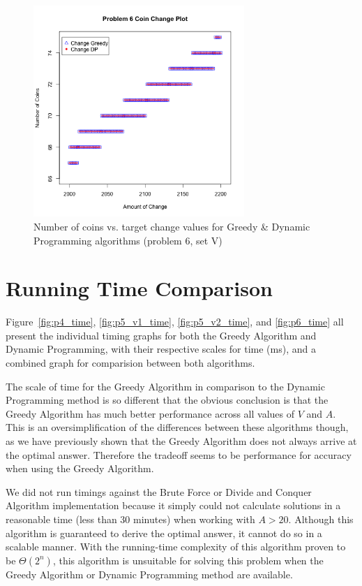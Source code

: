 \documentclass[11pt]{scrreprt}
\begin{document}
\begin{figure}[!h]
\centering
\includegraphics[width=8cm]{situation3.png}
\caption{Number of coins vs. target change values for Greedy \& Dynamic Programming algorithms (problem 6, set V)}
\label{fig:p6}
\end{figure}

\section{Running Time Comparison}
\label{sec:timings}

Figure~\ref{fig:p4_time}, \ref{fig:p5_v1_time}, \ref{fig:p5_v2_time}, and \ref{fig:p6_time} all present the individual timing graphs for both the Greedy Algorithm and Dynamic Programming, with their respective scales for time (ms), and a combined graph for comparision between both algorithms.

The scale of time for the Greedy Algorithm in comparison to the Dynamic Programming method is so different that the obvious conclusion is that the Greedy Algorithm has much better performance across all values of $V$ and $A$. This is an oversimplification of the differences between these algorithms though, as we have previously shown that the Greedy Algorithm does not always arrive at the optimal answer. Therefore the tradeoff seems to be performance for accuracy when using the Greedy Algorithm.

We did not run timings against the Brute Force or Divide and Conquer Algorithm implementation because it simply could not calculate solutions in a reasonable time (less than 30 minutes) when working with $A>20$. Although this algorithm is guaranteed to derive the optimal answer, it cannot do so in a scalable manner. With the running-time complexity of this algorithm proven to be $\Theta(2^n)$, this algorithm is unsuitable for solving this problem when the Greedy Algorithm or Dynamic Programming method are available.
\end{document}

